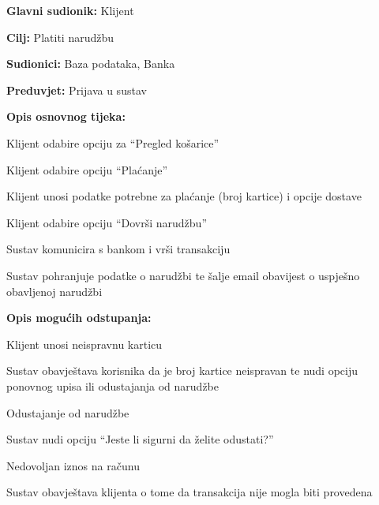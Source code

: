 				\noindent {}
				\begin{packed_item}
					
					\item \textbf{Glavni sudionik: } Klijent
					\item  \textbf{Cilj:} Platiti narudžbu 
					\item  \textbf{Sudionici:} Baza podataka, Banka
					\item  \textbf{Preduvjet:}  Prijava u sustav
					\item  \textbf{Opis osnovnog tijeka:}
					
					\item[] \begin{packed_enum}
						\item Klijent odabire opciju za “Pregled košarice”
						\item Klijent odabire opciju “Plaćanje”
						\item Klijent unosi podatke potrebne za plaćanje (broj kartice) i opcije dostave
						\item Klijent odabire opciju “Dovrši narudžbu”
						\item Sustav komunicira s bankom i vrši transakciju
						\item Sustav pohranjuje podatke o narudžbi te šalje email obavijest o uspješno obavljenoj narudžbi
					\end{packed_enum}
					\item  \textbf{Opis mogućih odstupanja:}
					\item[] \begin{packed_item}
						\item[3.a]      Klijent unosi neispravnu karticu
						\item[] \begin{packed_enum}
							\item         Sustav obavještava korisnika da je broj kartice neispravan te nudi opciju ponovnog upisa ili odustajanja od narudžbe
						\end{packed_enum}
						
						\item[4.a]      Odustajanje od narudžbe
						\item[] \begin{packed_enum}
							\item         Sustav nudi opciju “Jeste li sigurni da želite odustati?”
						\end{packed_enum}
						\item[5.a]  Nedovoljan iznos na računu
						\item[] \begin{packed_enum}
							\item         Sustav obavještava klijenta o tome da transakcija nije mogla biti provedena
						\end{packed_enum}
					\end{packed_item}
				\end{packed_item}
				
